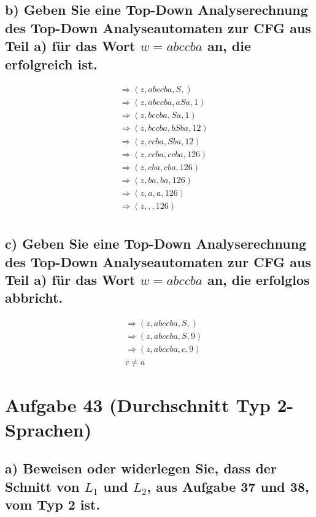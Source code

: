 \documentclass{article}
\begin{document}
\subsection*{b) Geben Sie eine Top-Down Analyserechnung des Top-Down Analyseautomaten zur CFG aus Teil a) für das Wort $w=abccba$ an, die erfolgreich ist.}

\begin{equation}
\begin{split}
&\Rightarrow(z, abccba, S, ) \\\ 
&\Rightarrow(z, abccba, aSa, 1) \\\ 
&\Rightarrow(z, bccba, Sa, 1) \\\ 
&\Rightarrow(z, bccba, bSba, 1 2) \\\ 
&\Rightarrow(z, ccba, Sba, 1 2) \\\
&\Rightarrow(z, ccba, ccba, 1 2 6) \\\
&\Rightarrow(z, cba, cba, 1 2 6) \\\
&\Rightarrow(z, ba, ba, 1 2 6) \\\
&\Rightarrow(z, a, a, 1 2 6) \\\
&\Rightarrow(z, , , 1 2 6) \\\
\end{split}
\end{equation}


\subsection*{c) Geben Sie eine Top-Down Analyserechnung des Top-Down Analyseautomaten zur CFG aus Teil a) für das Wort $w=abccba$ an, die erfolglos abbricht.}

\begin{equation}
\begin{split}
&\Rightarrow(z, abccba, S, ) \\\ 
&\Rightarrow(z, abccba, S, 9) \\\ 
&\Rightarrow(z, abccba, c, 9) \\\ 
&c \neq a
\end{split}
\end{equation}

\newpage
\section*{Aufgabe 43 (Durchschnitt Typ 2-Sprachen)}

\subsection*{a) Beweisen oder widerlegen Sie, dass der Schnitt von $L_1$ und $L_2$, aus Aufgabe 37 und 38, vom Typ 2 ist.}
\end{document}
